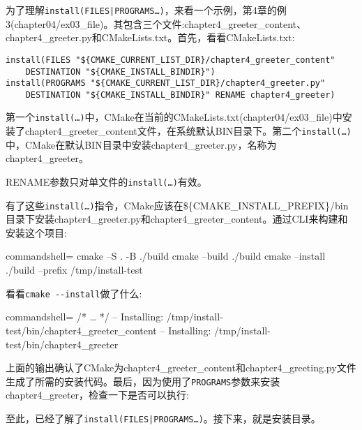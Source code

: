为了理解\texttt{install(FILES|PROGRAMS…)}，来看一个示例，第4章的例3(chapter04/ex03\_file)。其包含三个文件:chapter4\_greeter\_content、chapter4\_greeter.py和CMakeLists.txt。首先，看看CMakeLists.txt:

\begin{lstlisting}[style=styleCMake]
install(FILES "${CMAKE_CURRENT_LIST_DIR}/chapter4_greeter_content"
	DESTINATION "${CMAKE_INSTALL_BINDIR}")
install(PROGRAMS "${CMAKE_CURRENT_LIST_DIR}/chapter4_greeter.py"
	DESTINATION "${CMAKE_INSTALL_BINDIR}" RENAME chapter4_greeter)
\end{lstlisting}

第一个\texttt{install(…)}中，CMake在当前的CMakeLists.txt(chapter04/ex03\_file)中安装了chapter4\_greeter\_content文件，在系统默认BIN目录下。第二个\texttt{install(…)}中，CMake在默认BIN目录中安装chapter4\_greeter.py，名称为chapter4\_greeter。

\begin{tcolorbox}[colback=webgreen!5!white,colframe=webgreen!75!black,title=Note]
RENAME参数只对单文件的\texttt{install(…)}有效。
\end{tcolorbox}

有了这些\texttt{install(…)}指令，CMake应该在\$\{CMAKE\_INSTALL\_PREFIX\}/bin目录下安装chapter4\_greeter.py和chapter4\_greeter\_content。通过CLI来构建和安装这个项目:

\begin{tcblisting}{commandshell={}}
cmake –S . -B ./build
cmake --build ./build
cmake --install ./build --prefix /tmp/install-test
\end{tcblisting}

看看\texttt{cmake -{}-install}做了什么:

\begin{tcblisting}{commandshell={}}
/* … */
-- Installing: /tmp/install-test/bin/chapter4_greeter_content
-- Installing: /tmp/install-test/bin/chapter4_greeter
\end{tcblisting}

上面的输出确认了CMake为chapter4\_greeter\_content和chapter4\_greeting.py文件生成了所需的安装代码。最后，因为使用了\texttt{PROGRAMS}参数来安装chapter4\_greeter，检查一下是否可以执行:


至此，已经了解了\texttt{install(FILES|PROGRAMS…)}。接下来，就是安装目录。

